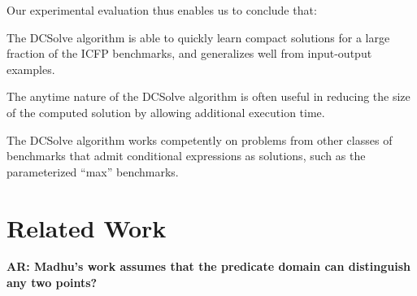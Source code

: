\documentclass{llncs}
\newcommand\arsays[1]{{\bf AR: #1}}
\newcommand{\dcsolve}{{\sffamily\fontsize{8.5}{10}\selectfont DCSolve}\xspace}
\begin{document}
Our experimental evaluation thus enables us to conclude that:
\begin{inparaenum}[(a)]
\item
The \dcsolve algorithm is able to quickly learn compact solutions for
a large fraction of the ICFP benchmarks, and generalizes well from
input-output examples.
\item
The anytime nature of the \dcsolve algorithm is often useful in
reducing the size of the computed solution by allowing additional
execution time.
\item
The \dcsolve algorithm works competently on problems from other
classes of benchmarks that admit conditional expressions as solutions,
such as the parameterized ``max'' benchmarks.
\end{inparaenum}
\section{Related Work}
\label{sec:related_work}


\setlength{\bibsep}{1pt}
\begin{small}

\end{small}

\arsays{Madhu's work assumes that the predicate domain can distinguish
any two points?}
\end{document}
